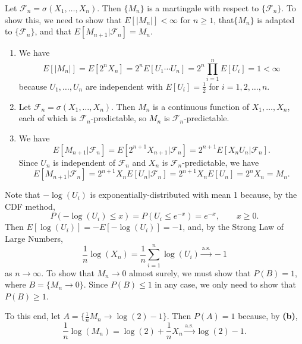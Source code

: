 \documentclass{homework}
\newcommand{\fil}{\mathcal{F}}
\begin{document}
	\question
	\begin{alphaparts}
		\questionpart Let $\fil_n = \sigma(X_1, \dots, X_n)$. Then $\{M_n\}$ is a martingale with respect to $\{\fil_n\}$. To show this, we need to show that $E[|M_n|] < \infty$ for $n\ge1$, that$\{M_n\}$ is adapted to $\{\fil_n\}$, and that $E[M_{n+1} |\fil_n] = M_n$.
		\begin{enumerate}[label=\arabic*.]
			\item We have
			\begin{equation*}
				E[|M_n|] = E[2^nX_n] = 2^n E[U_1\cdots U_n] = 2^n \prod_{i=1}^n E[U_i] = 1 < \infty
			\end{equation*}
			because $U_1,\dots, U_n$ are independent with $E[U_i] = \frac{1}{2}$ for $i = 1,2,\dots, n$.
			
			\item Let $\fil_n = \sigma(X_1,\dots, X_n)$. Then $M_n$ is a continuous function of $X_1, \dots, X_n$, each of which is $\fil_n$-predictable, so $M_n$ is $\fil_n$-predictable.
			
			\item We have
			\begin{equation*}
				E[M_{n+1}|\fil_n] = E[2^{n+1}X_{n+1}|\fil_n] = 2^{n+1}E[X_nU_n|\fil_n].
			\end{equation*}
			Since $U_n$ is independent of $\fil_n$ and $X_n$ is $\fil_n$-predictable, we have
			\begin{equation*}
				E[M_{n+1}|\fil_n] = 2^{n+1}X_nE[U_n|\fil_n] = 2^{n+1}X_nE[U_n] = 2^nX_n = M_n.
			\end{equation*}
		\end{enumerate}
		
		\questionpart Note that $-\log(U_i)$ is exponentially-distributed with mean 1 because, by the CDF method,
		\begin{equation*}
			P(-\log(U_i) \le x) = P(U_i \le e^{-x}) = e^{-x}, \qquad x \ge 0.
		\end{equation*}
		Then $E[\log(U_i)]= -E[-\log(U_i)]= -1$, and, by the Strong Law of Large Numbers,
		\begin{equation*}
			\frac{1}{n}\log(X_n) = \frac{1}{n}\sum_{i=1}^n\log(U_i) \overset{\text{a.s.}}{\longrightarrow}-1
		\end{equation*}
		as $n \to \infty$.
		\questionpart To show that $M_n \to 0$ almost surely, we must show that $P(B) = 1$, where $B = \{M_n \to 0\}$. Since $P(B) \le 1$ in any case, we only need to show that $P(B) \ge 1$. 
		
		To this end, let $A = \{\frac{1}{n}M_n \to \log(2) -1\}$. Then $P(A) = 1$ because, by {\bf(b)},
		\begin{equation*}
			\frac{1}{n}\log(M_n) =  \log(2) + \frac{1}{n}X_n \overset{\text{a.s.}}{\longrightarrow} \log(2) - 1.
		\end{equation*}
		

\end{alphaparts}
\end{document}
